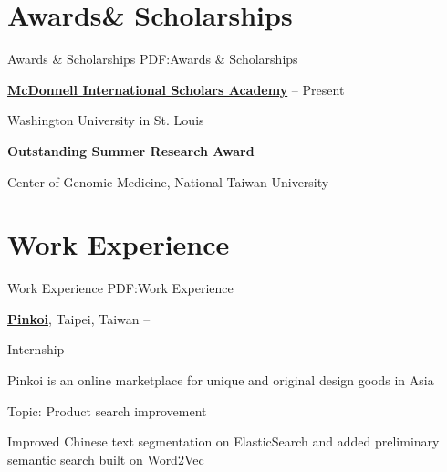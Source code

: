 \documentclass[a4paper,12pt,oneside]{article}
\begin{document}
\begin{body}
\section
{Awards\newline\& Scholarships}
{Awards \& Scholarships}
{PDF:Awards \& Scholarships}

\href{https://global.wustl.edu/mcdonnell-academy/}
{\textbf{McDonnell International Scholars Academy}}
\hfill
{} --
Present
\par
Washington University in St. Louis

\EntryGapNoBreak
\textbf{Outstanding Summer Research Award}
\hfill
{}
\par
Center of Genomic Medicine, National Taiwan University




\section{Work Experience}
{Work Experience}
{PDF:Work Experience}

\href{http://pinkoi.com}
{\textbf{Pinkoi}},
Taipei, Taiwan
\hfill
{} --
\par
Internship
\begin{detail}
    \begin{detailitem}
    \item Pinkoi is an online marketplace for unique and original design goods in Asia
    \item Topic: Product search improvement
    \item Improved Chinese text segmentation on ElasticSearch and added
        preliminary semantic search built on Word2Vec
    \end{detailitem}
\end{detail}



\end{body}
\end{document}
